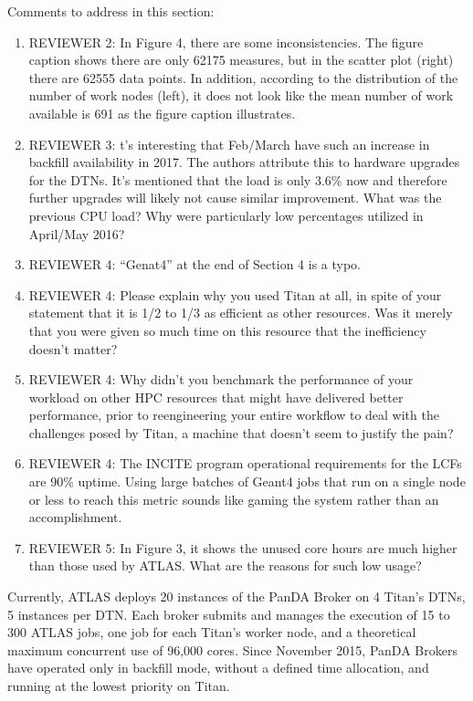 \ifreview
Comments to address in this section:
\begin{enumerate}
    \item REVIEWER 2: In Figure 4, there are some inconsistencies. The figure
    caption shows there are only 62175 measures, but in the scatter plot
    (right) there are 62555 data points. In addition, according to the
    distribution of the number of work nodes (left), it does not look like
    the mean number of work available is 691 as the figure caption
    illustrates.
    \item REVIEWER 3: t’s interesting that Feb/March have such an increase in
    backfill availability in 2017. The authors attribute this to hardware
    upgrades for the DTNs. It’s mentioned that the load is only 3.6\% now and
    therefore further upgrades will likely not cause similar improvement.
    What was the previous CPU load? Why were particularly low percentages
    utilized in April/May 2016?
    \item REVIEWER 4: “Genat4” at the end of Section 4 is a typo.
    \item REVIEWER 4: Please explain why you used Titan at all, in spite of
    your statement that it is 1/2 to 1/3 as efficient as other resources. Was
    it merely that you were given so much time on this resource that the
    inefficiency doesn’t matter?
    \item REVIEWER 4: Why didn’t you benchmark the performance of your
    workload on other HPC resources that might have delivered better
    performance, prior to reengineering your entire workflow to deal with the
    challenges posed by Titan, a machine that doesn’t seem to justify the
    pain?
    \item REVIEWER 4: The INCITE program operational requirements for the
    LCFs are 90\% uptime. Using large batches of Geant4 jobs that run on a
    single node or less to reach this metric sounds like gaming the system
    rather than an accomplishment.
    \item REVIEWER 5: In Figure 3, it shows the unused core hours are much
    higher than those used by ATLAS. What are the reasons for such low usage?
\end{enumerate}
\fi

Currently, ATLAS deploys 20 instances of the PanDA Broker on 4 Titan's DTNs,
5 instances per DTN\@. Each broker submits and manages the execution of 15 to
300 ATLAS jobs, one job for each Titan's worker node, and a theoretical
maximum concurrent use of 96,000 cores. Since November 2015, PanDA Brokers
have operated only in backfill mode, without a defined time allocation, and
running at the lowest priority on Titan.

